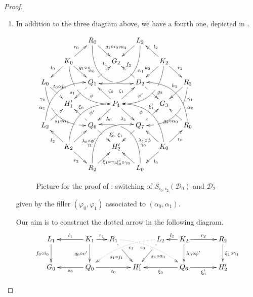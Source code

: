 \documentclass[a4paper,UKenglish,cleveref,pdftex,thm-restate,numberwithinsect,anonymous]{lipics}
\def\G{\textbf {\textup{G}}}
\newcommand{\dder}[1]{\mathscr{#1}}
\begin{document}
\begin{proof}
\begin{enumerate}
		\item In addition to the three diagram above, we have a fourth one, depicted in .
		\begin{figure}[h]
			\centering
			$\xymatrix@C=15pt@R=15pt{&&R_0 \ar@/_1cm/[ddrr]_(.35){\alpha_0}|(.7)\hole \ar[dr]^{g_1\circ i_0}&& L_2\ar@/^1cm/[ddll]^(.35){\alpha_1}  \ar[dl]_{m_2}\\
				&K_0\ar[dr]^{\hspace{-4pt}q_1\circ v}\ar[dl]_{l_0} \ar@/_.8cm/[ddrr]|(.36)\hole^(.65){\varphi}\ar[ur]^{r_0}&& G_2 && K_2 \ar@/^.8cm/[ddll]|(.36)\hole_(.65){\varphi'}\ar[dl]_{k_2}\ar[lu]_{l_2} \ar[dr]^{r_2}\\
				L_0 \ar@/_.8cm/[ddrr]_(.2){\gamma_0}|(.31)\hole|(.81)\hole \ar[dr]^(.4){\hspace{-4pt}t_0\circ j_0}|(.61)\hole && Q_1 \ar[dl]|(.4)\hole_(.65){s_1}\ar[ur]|(.5)\hole^(.7){t_1}&&D_2 \ar[dr]|(.4)\hole^(.65){g_2} \ar[ul]|(.5)\hole_(.65){f_2}&&R_2\ar@/^.8cm/[ddll]^(.2){\gamma_1}|(.31)\hole|(.81)\hole\ar[dl]_(.35){h_2}\\&H'_1 &&P_4\ar[dr]_{\lambda_1} \ar[dl]^{\lambda_0}\ar[ur]^(.4){\zeta_1}\ar[ul]_(.4){\zeta_0}&&G_3\\
				L_2 \ar@/^.8cm/[uurr]^(.2){\alpha_1} \ar[ur]_(.35){s_1\circ
					\alpha_1}|(.61)\hole&&Q_6
				\ar[ul]|(.4)\hole_(.65){\xi_0}\ar[dr]|(.5)\hole^(.65){\xi'_0}
				&&Q_7\ar[ur]|(.4)\hole^(.65){\xi'_1}
				\ar[dl]|(.5)\hole_(.65){\xi_1} && R_0 \ar[ul]^(.35){g_2\circ
					\alpha_0}|(.61)\hole\ar@/_.8cm/[uull]_(.2){\alpha_0}\\&K_2
				\ar[ur]_{\lambda_0\circ \phi'} \ar[dr]_{r_2}
				\ar[ul]^{l_2}\ar@/^.8cm/[uurr]_(.65){\phi'}&&H'_2&& K_0
				\ar[ur]_{r_0} \ar[ul]^{\lambda_1\circ \phi} \ar[dl]^{l_0}
				\ar@/_.8cm/[uull]^(.65){\phi}\\&& R_2
				\ar[ur]_{\hspace{-4pt}\xi_1\circ
					\gamma_1}\ar@/^1cm/[uurr]^(.25){\gamma_1}&& L_0
				\ar[ul]^{\xi'_0\circ \gamma_0\hspace{-5pt}}
				\ar@/_1cm/[uull]_(.25){\gamma_0} |(.69)\hole 
			}	$
			\caption{Picture for the proof of : switching of $S_{i_0, i_2}(\dder{D}_0)$ and $\dder{D}_2$}
			\label{fi:fourth}
		\end{figure}
		given by the filler $(\varphi_0, \varphi_1)$ associated to
		$(\alpha_0, \alpha_1)$.
		\iffalse \[}\]
		\fi 
		Our aim is to construct the dotted arrow in the following
		diagram.
		\[\xymatrix@C=15pt{L_1 \ar[d]_{f_0\circ i_0}&& K_1
			\ar[d]_{q_0\circ v'}\ar[ll]_{l_1} \ar[r]^{r_1} & R_1
			\ar@{.>}@/^.35cm/[drrr]_(.4){\epsilon_0}|(.285)\hole
			\ar[dr]|(.28)\hole_{s_1\circ j_1} && L_2
			\ar@{.>}@/_.35cm/[dlll]^(.4){\epsilon_1}
			\ar[dl]|(.28)\hole^{s_1\circ \alpha_1}& K_2
			\ar[d]^{\lambda_0\circ \phi'}\ar[l]_{l_2} \ar[rr]^{r_2} &&
			R_2 \ar[d]^{\xi_1\circ \gamma_1}\\G_0 && \ar[ll]^{s_0} Q_0
			\ar[rr]_{t_0}&& H'_1 && \ar[ll]^{\xi_0} Q_6
			\ar[rr]_{\xi'_0}&& H'_2}\]
		

\end{enumerate}
\end{proof}
\end{document}
